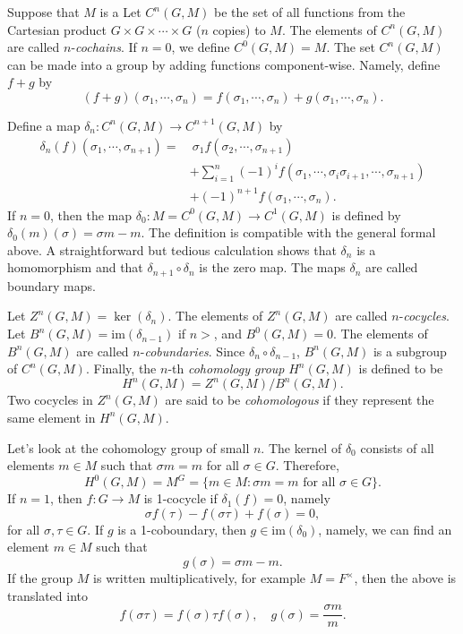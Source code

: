 \documentclass[12pt]{report}
\theoremstyle{definition}
\newcommand{\im}{\text{im}}
\begin{document}
Suppose that $M$ is a Let $C^n(G,M)$ be the set of all functions from the Cartesian product $G\times G\times\cdots\times G$ ($n$ copies) to $M$. The elements of $C^n(G,M)$ are called $n$-\emph{cochains}. If $n=0$, we define $C^0(G,M)=M$. The set $C^n(G,M)$ can be made into a group by adding functions component-wise. Namely, define $f+g$  by $$(f+g)(\sigma_1,\cdots,\sigma_n)=f(\sigma_1,\cdots,\sigma_n)+g(\sigma_1,\cdots,\sigma_n).$$

Define a map $\delta_n: C^n(G,M)\to C^{n+1}(G,M)$ by \begin{align*}
	\delta_n(f)(\sigma_1,\cdots,\sigma_{n+1})= &~ \sigma_1f(\sigma_2,\cdots,\sigma_{n+1})                                        \\
	                                           & +\sum_{i=1}^n(-1)^if(\sigma_1,\cdots,\sigma_i\sigma_{i+1},\cdots,\sigma_{n+1}) \\
	                                           & + (-1)^{n+1} f(\sigma_1,\cdots,\sigma_n).
\end{align*}
If $n=0$, then the map $\delta_0: M=C^0(G,M)\to C^1(G,M)$ is defined by $\delta_0(m)(\sigma)=\sigma m-m$. The definition is compatible with the general formal above. A straightforward but tedious calculation shows that $\delta_n$ is a homomorphism and that $\delta_{n+1}\circ\delta_n$ is the zero map. The maps $\delta_n$ are called boundary maps.


Let $Z^n(G,M)=\ker(\delta_n)$. The elements of $Z^n(G,M)$ are called $n$-\emph{cocycles}. Let $B^n(G,M)=\im(\delta_{n-1})$ if $n>$, and $B^0(G,M)=0$. The elements of $B^n(G,M)$ are called $n$-\emph{cobundaries}. Since $\delta_n\circ\delta_{n-1}$, $B^n(G,M)$ is a subgroup of $C^n(G,M)$. Finally, the $n$-th \emph{cohomology group} $H^n(G,M)$ is defined to be $$H^n(G,M)=Z^n(G,M)/B^n(G,M).$$ Two cocycles in $Z^n(G,M)$ are said to be \emph{cohomologous} if they represent the same element in $H^n(G,M)$.

Let's look at the cohomology group of small $n$. The kernel of $\delta_0$ consists of all elements $m\in M$ such that $\sigma m=m$ for all $\sigma\in G$. Therefore, $$H^0(G,M)=M^G=\{m\in M: \sigma m =m \mbox{ for all }\sigma\in G\}.$$
If $n=1$, then $f:G\to M$ is 1-cocycle if $\delta_1(f)=0$, namely $$\sigma f(\tau)-f(\sigma\tau)+f(\sigma)=0,$$ for all $\sigma,\tau \in G$. If $g$ is a 1-coboundary, then $g\in \im(\delta_0)$, namely, we can find an element $m\in M$ such that $$g(\sigma)=\sigma m -m.$$ If the group $M$ is written multiplicatively, for example $M= F^\times$, then the above is translated into $$f(\sigma\tau)=f(\sigma)\tau f(\sigma),\quad g(\sigma)=\frac{\sigma m}{m}.$$
\end{document}
